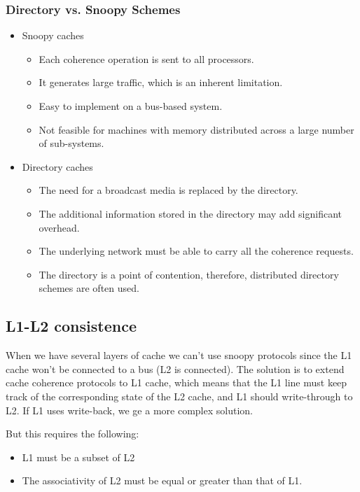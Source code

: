 \subsubsection{Directory vs. Snoopy Schemes}
\begin{itemize}
\item Snoopy caches
  \begin{itemize}
  \item Each coherence operation is sent to all processors.
  \item It generates large traffic, which is an inherent limitation.
  \item Easy to implement on a bus-based system.
  \item Not feasible for machines with memory distributed across a large number of sub-systems.
  \end{itemize}
\item Directory caches
  \begin{itemize}
  \item The need for a broadcast media is replaced by the directory.
  \item The additional information stored in the directory may add significant overhead.
  \item The underlying network must be able to carry all the coherence requests.
  \item The directory is a point of contention, therefore, distributed directory schemes are often used.
  \end{itemize}
\end{itemize}
\subsection{L1-L2 consistence}
When we have several layers of cache we can't use snoopy protocols since the L1 cache won't be connected to a bus (L2 is connected). The solution is to extend cache coherence protocols to L1 cache, which means that the L1 line must keep track of the corresponding state of the L2 cache, and L1 should write-through to L2. If L1 uses write-back, we ge a more complex solution.

But this requires the following:
\begin{itemize}
\item L1 must be a subset of L2
\item The associativity of L2 must be equal or greater than that of L1.
\end{itemize}

